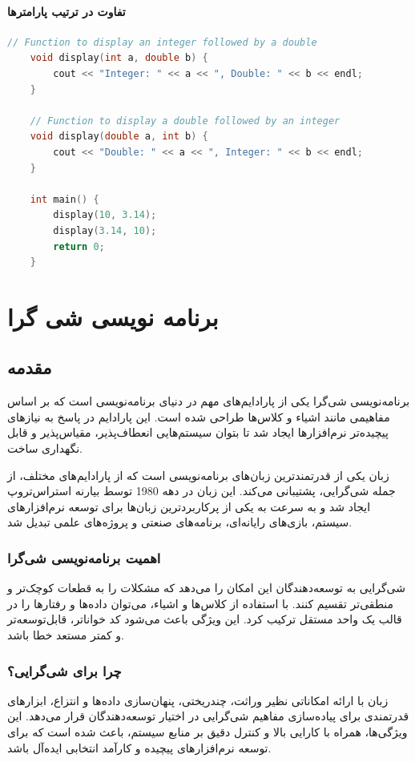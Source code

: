 \documentclass[12pt, a4paper]{report}
\begin{document}
\subsubsection{تفاوت در ترتیب پارامترها}

\begin{LTR}
\begin{lstlisting}[language=C++, breaklines=true]
	// Function to display an integer followed by a double
	void display(int a, double b) {
		cout << "Integer: " << a << ", Double: " << b << endl;
	}
	
	// Function to display a double followed by an integer
	void display(double a, int b) {
		cout << "Double: " << a << ", Integer: " << b << endl;
	}
	
	int main() {
		display(10, 3.14);
		display(3.14, 10);
		return 0;
	}
\end{lstlisting}
\end{LTR}
\chapter{برنامه نویسی شی گرا}
\section{مقدمه}
برنامه‌نویسی شی‌گرا  یکی از پارادایم‌های مهم در دنیای برنامه‌نویسی است که بر اساس مفاهیمی مانند اشیاء  و کلاس‌ها  طراحی شده است. این پارادایم در پاسخ به نیازهای پیچیده‌تر نرم‌افزارها ایجاد شد تا بتوان سیستم‌هایی انعطاف‌پذیر، مقیاس‌پذیر و قابل نگهداری ساخت.

زبان  یکی از قدرتمندترین زبان‌های برنامه‌نویسی است که از پارادایم‌های مختلف، از جمله شی‌گرایی، پشتیبانی می‌کند. این زبان در دهه 1980 توسط بیارنه استراس‌تروپ ایجاد شد و به سرعت به یکی از پرکاربردترین زبان‌ها برای توسعه نرم‌افزارهای سیستم، بازی‌های رایانه‌ای، برنامه‌های صنعتی و پروژه‌های علمی تبدیل شد.
\subsection{اهمیت برنامه‌نویسی شی‌گرا}
شی‌گرایی به توسعه‌دهندگان این امکان را می‌دهد که مشکلات را به قطعات کوچک‌تر و منطقی‌تر تقسیم کنند. با استفاده از کلاس‌ها و اشیاء، می‌توان داده‌ها و رفتارها را در قالب یک واحد مستقل ترکیب کرد. این ویژگی باعث می‌شود کد خواناتر، قابل‌توسعه‌تر و کمتر مستعد خطا باشد.


\subsection{چرا  برای شی‌گرایی؟}
زبان  با ارائه امکاناتی نظیر وراثت، چندریختی، پنهان‌سازی داده‌ها و انتزاع، ابزارهای قدرتمندی برای پیاده‌سازی مفاهیم شی‌گرایی در اختیار توسعه‌دهندگان قرار می‌دهد. این ویژگی‌ها، همراه با کارایی بالا و کنترل دقیق بر منابع سیستم، باعث شده است که  برای توسعه نرم‌افزارهای پیچیده و کارآمد انتخابی ایده‌آل باشد.
\end{document}
